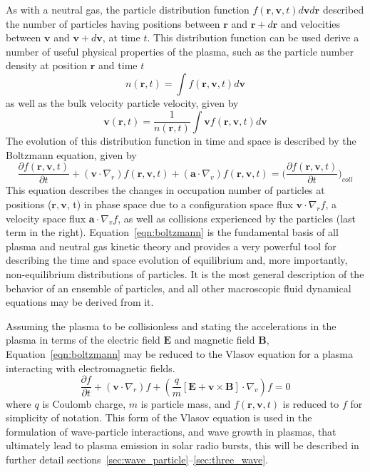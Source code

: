As with a neutral gas, the particle distribution function $f(\mathbf{r}, \mathbf{v}, t)d\mathbf{v}d\mathbf{r}$ described the number of particles having positions between $\mathbf{r}$ and $\mathbf{r}+d\mathbf{r}$ and velocities between $\mathbf{v}$ and $\mathbf{v}+d\mathbf{v}$, at time $t$. This distribution function can be used derive a number of useful physical properties of the plasma, such as the particle number density at position $\mathbf{r}$ and time $t$ 
\begin{equation}
n(\mathbf{r},t) = \int f(\mathbf{r}, \mathbf{v},t) d \mathbf{v}
\label{eqn:num_density}
\end{equation}
as well as the bulk velocity particle velocity, given by
\begin{equation}
 \mathbf{v}(\mathbf{r},t) = \frac{1}{n(\mathbf{r},t)}\int  \mathbf{v} f(\mathbf{r}, \mathbf{v},t) d \mathbf{v}
\label{eqn:bulk_flow}
\end{equation}
The evolution of this distribution function in time and space is described by the Boltzmann equation, given by
\begin{equation}
\frac{\partial f(\mathbf{r}, \mathbf{v},t)}{\partial t}  +     ( \mathbf{v}\cdot\nabla_r)f(\mathbf{r}, \mathbf{v},t)    + (\mathbf{a}\cdot\nabla_v)f(\mathbf{r}, \mathbf{v},t) = \bigg(\frac{\partial f(\mathbf{r}, \mathbf{v},t)}{\partial t}\bigg)_{coll}
\label{eqn:boltzmann}
\end{equation}
This equation describes the changes in occupation number of particles at positions ($\mathbf{r}, \mathbf{v}$, t) in phase space due to a configuration space flux $\mathbf{v}\cdot\nabla_rf$, a velocity space flux $ \mathbf{a}\cdot\nabla_vf$, as well as collisions experienced by the particles (last term in the right). Equation~\ref{eqn:boltzmann} is the fundamental basis of all plasma and neutral gas kinetic theory and provides a very powerful tool for describing the time and space evolution of equilibrium and, more importantly, non-equilibrium distributions of particles. It is the most general description of the behavior of an ensemble of particles, and all other macroscopic fluid dynamical equations may be derived from it.

Assuming  the plasma to be collisionless and stating the accelerations in the plasma in terms of the electric field $\mathbf{E}$ and magnetic field $\mathbf{B}$, Equation~\ref{eqn:boltzmann} may be reduced to the Vlasov equation for a plasma interacting with electromagnetic fields.
\begin{equation}
\frac{\partial f}{\partial t}  +(\mathbf{v}\cdot\nabla_r)f + (\frac{q}{m}[\mathbf{E} + \mathbf{v}\times \mathbf{B}]\cdot\nabla_v)f = 0
\end{equation}
where $q$ is Coulomb charge, $m$ is particle mass, and $f(\mathbf{r}, \mathbf{v},t)$ is reduced to $f$ for simplicity of notation. This form of the Vlasov equation is used in the formulation of wave-particle interactions, and wave growth in plasmas, that ultimately lead to plasma emission in solar radio bursts, this will be described in further detail sections~\ref{sec:wave_particle}--\ref{sec:three_wave}.

